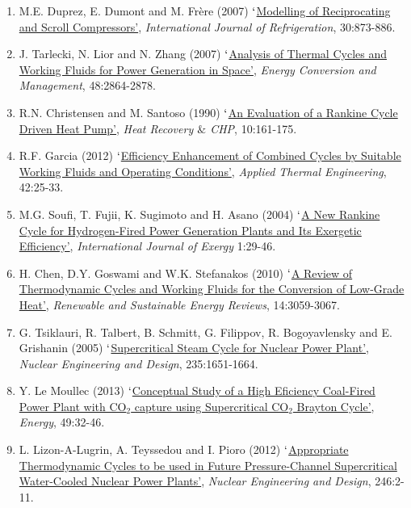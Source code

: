\documentclass[12pts,a4paper]{report}%
\begin{document}
\begin{enumerate}[label=\bfseries Group \arabic*:]
\item M.E. Duprez, E. Dumont and M. Fr\`ere (2007) \href{http://dx.doi.org/10.1016/j.ijrefrig.2006.11.014}{$\lq$Modelling of Reciprocating and Scroll Compressors'}, {\it International Journal of Refrigeration}, 30:873-886.
%
\item J. Tarlecki, N. Lior and N. Zhang (2007) \href{http://dx.doi.org/10.1016/j.enconman.2007.06.039}{$\lq$Analysis of Thermal Cycles and Working Fluids for Power Generation in Space'}, {\it Energy Conversion and Management}, 48:2864-2878.
%
\item R.N. Christensen and M. Santoso (1990) \href{http://dx.doi.org/10.1016/0890-4332(90)90169-K}{$\lq$An Evaluation of a Rankine Cycle Driven Heat Pump'}, {\it Heat Recovery $\&$ CHP}, 10:161-175.
%
\item R.F. Garcia (2012) \href{http://dx.doi.org/10.1016/j.applthermaleng.2012.02.039}{$\lq$Efficiency Enhancement of Combined Cycles by Suitable Working Fluids and Operating Conditions'}, {\it Applied Thermal Engineering}, 42:25-33.
%
\item M.G. Soufi, T. Fujii, K. Sugimoto and H. Asano (2004) \href{http://inderscience.metapress.com/content/vvmpkbwp3x0fk08c/?genre=article&issn=1742-8297&volume=1&issue=1&spage=29}{$\lq$A New Rankine Cycle for Hydrogen-Fired Power Generation Plants and Its Exergetic Efficiency'}, {\it International Journal of Exergy} 1:29-46.
%
\item H. Chen, D.Y. Goswami and W.K. Stefanakos (2010) \href{http://dx.doi.org/10.1016/j.rser.2010.07.006}{$\lq$A Review of Thermodynamic Cycles and Working Fluids for the Conversion of Low-Grade Heat'}, {\it Renewable and Sustainable Energy Reviews}, 14:3059-3067.
%
\item G. Tsiklauri, R. Talbert, B. Schmitt, G. Filippov, R. Bogoyavlensky and E. Grishanin (2005) \href{http://dx.doi.org/10.1016/j.nucengdes.2004.11.016}{$\lq$Supercritical Steam Cycle for Nuclear Power Plant'}, {\it Nuclear Engineering and Design}, 235:1651-1664.
%
\item Y. Le Moullec (2013) \href{http://dx.doi.org/10.1016/j.energy.2012.10.022}{$\lq$Conceptual Study of a High Eficiency Coal-Fired Power Plant with CO$_{2}$ capture using Supercritical CO$_{2}$ Brayton Cycle'}, {\it Energy}, 49:32-46.
%
\item L. Lizon-A-Lugrin, A. Teyssedou and I. Pioro (2012) \href{http://dx.doi.org/10.1016/j.nucengdes.2011.07.024}{$\lq$Appropriate Thermodynamic Cycles to be used in Future Pressure-Channel Supercritical Water-Cooled Nuclear Power Plants'}, {\it Nuclear Engineering and Design}, 246:2-11.

\end{enumerate}
\end{document}
